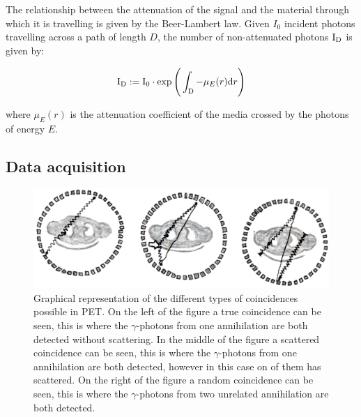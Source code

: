                 The relationship between the attenuation of the signal and the material through which it is travelling is given by the Beer-Lambert law. Given $I_0$ incident photons travelling across a path of length $D$, the number of non-attenuated photons $\mathrm{I}_{\mathrm{D}}$ is given by:
                 
                \begin{equation} \label{sec:eq:beer_lambert_law}
                    \mathrm{I}_{\mathrm{D}} := \mathrm{I}_{0} \cdot \exp\Bigg(\int_{\mathrm{D}} - \mu_E(r)\mathrm{d} r \Bigg)
                \end{equation}

                \noindent where $\mu_E(r)$ is the attenuation coefficient of the media crossed by the photons of energy $E$.
        
        \subsection{Data acquisition} \label{sec:data_acquisition}
            
            \begin{figure}
                \centering
                
                \includegraphics[width=1.0\linewidth]{figures/background_coincidence.png}
                
                \captionsetup{singlelinecheck=false, justification=raggedright}
                \caption{Graphical representation of the different types of coincidences possible in \gls{PET}. On the left of the figure a true coincidence can be seen, this is where the $\gamma$-photons from one annihilation are both detected without scattering. In the middle of the figure a scattered coincidence can be seen, this is where the $\gamma$-photons from one annihilation are both detected, however in this case on of them has scattered. On the right of the figure a random coincidence can be seen, this is where the $\gamma$-photons from two unrelated annihilation are both detected.} \label{fig:data_acquisition_coincidence}
            \end{figure}
            
